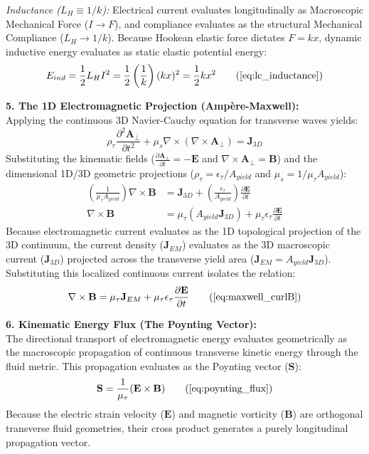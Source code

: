 \documentclass[11pt, a4paper]{article}
\begin{document}
\textit{Inductance ($L_H \equiv 1/k$):} Electrical current evaluates longitudinally as Macroscopic Mechanical Force ($I \to F$), and compliance evaluates as the structural Mechanical Compliance ($L_H \to 1/k$). Because Hookean elastic force dictates $F = kx$, dynamic inductive energy evaluates as static elastic potential energy:
\begin{equation}
    E_{ind} = \frac{1}{2} L_H I^2 = \frac{1}{2} \left(\frac{1}{k}\right) (kx)^2 = \frac{1}{2} k x^2 \tag{\ref{eq:lc_inductance}}
\end{equation}

\textbf{5. The 1D Electromagnetic Projection (Ampère-Maxwell):} \\
Applying the continuous 3D Navier-Cauchy equation for transverse waves yields:
\begin{equation}
    \rho_{\tau} \frac{\partial^2 \mathbf{A}_{\perp}}{\partial t^2} + \mu_s \nabla \times (\nabla \times \mathbf{A}_{\perp}) = \mathbf{J}_{3D}
\end{equation}
Substituting the kinematic fields ($\frac{\partial \mathbf{A}_{\perp}}{\partial t} = -\mathbf{E}$ and $\nabla \times \mathbf{A}_{\perp} = \mathbf{B}$) and the dimensional 1D/3D geometric projections ($\rho_{\tau} = \epsilon_{\tau}/A_{yield}$ and $\mu_s = 1/\mu_{\tau} A_{yield}$):
\begin{align}
    \left( \frac{1}{\mu_{\tau} A_{yield}} \right) \nabla \times \mathbf{B} &= \mathbf{J}_{3D} + \left( \frac{\epsilon_{\tau}}{A_{yield}} \right) \frac{\partial \mathbf{E}}{\partial t} \nonumber \\
    \nabla \times \mathbf{B} &= \mu_{\tau} (A_{yield} \mathbf{J}_{3D}) + \mu_{\tau} \epsilon_{\tau} \frac{\partial \mathbf{E}}{\partial t}
\end{align}
Because electromagnetic current evaluates as the 1D topological projection of the 3D continuum, the current density ($\mathbf{J}_{EM}$) evaluates as the 3D macroscopic current ($\mathbf{J}_{3D}$) projected across the transverse yield area ($\mathbf{J}_{EM} = A_{yield} \mathbf{J}_{3D}$). Substituting this localized continuous current isolates the relation:
\begin{equation}
    \nabla \times \mathbf{B} = \mu_{\tau} \mathbf{J}_{EM} + \mu_{\tau} \epsilon_{\tau} \frac{\partial \mathbf{E}}{\partial t} \tag{\ref{eq:maxwell_curlB}}
\end{equation}

\textbf{6. Kinematic Energy Flux (The Poynting Vector):} \\
The directional transport of electromagnetic energy evaluates geometrically as the macroscopic propagation of continuous transverse kinetic energy through the fluid metric. This propagation evaluates as the Poynting vector ($\mathbf{S}$):
\begin{equation}
    \mathbf{S} = \frac{1}{\mu_{\tau}} (\mathbf{E} \times \mathbf{B}) \tag{\ref{eq:poynting_flux}}
\end{equation}
Because the electric strain velocity ($\mathbf{E}$) and magnetic vorticity ($\mathbf{B}$) are orthogonal transverse fluid geometries, their cross product generates a purely longitudinal propagation vector. 
\end{document}
